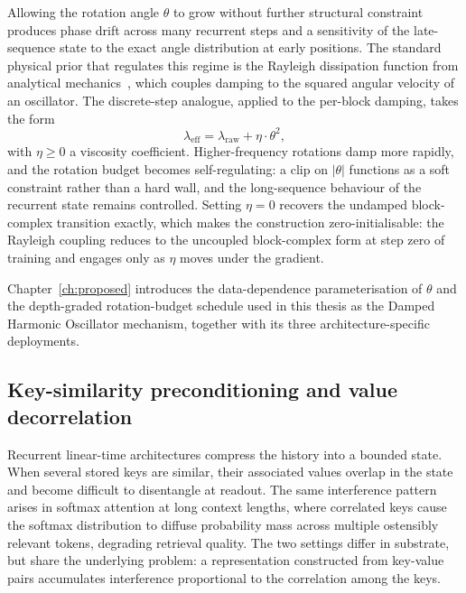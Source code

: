 Allowing the rotation angle $\theta$ to grow without further
structural constraint produces phase drift across many recurrent
steps and a sensitivity of the late-sequence state to the exact angle
distribution at early positions. The standard physical prior that
regulates this regime is the Rayleigh dissipation function from
analytical mechanics~\cite[Sections 1.5 and 2.5]{goldstein2002classical},
which couples damping to the squared angular velocity of an
oscillator. The discrete-step analogue, applied to the per-block
damping, takes the form
\begin{equation}\label{eq:rayleigh}
\lambda_{\mathrm{eff}} = \lambda_{\mathrm{raw}} + \eta \cdot \theta^{2},
\end{equation}
with $\eta \ge 0$ a viscosity coefficient. Higher-frequency rotations
damp more rapidly, and the rotation budget becomes self-regulating: a
clip on $|\theta|$ functions as a soft constraint rather than a hard
wall, and the long-sequence behaviour of the recurrent state remains
controlled. Setting $\eta = 0$ recovers the undamped block-complex
transition exactly, which makes the construction zero-initialisable:
the Rayleigh coupling reduces to the uncoupled block-complex form at
step zero of training and engages only as $\eta$ moves under the
gradient.

Chapter~\ref{ch:proposed} introduces the data-dependence
parameterisation of $\theta$ and the depth-graded rotation-budget
schedule used in this thesis as the Damped Harmonic Oscillator
mechanism, together with its three architecture-specific deployments.

\subsection{Key-similarity preconditioning and value decorrelation}\label{sec:primitives:cvd}

Recurrent linear-time architectures compress the history into a
bounded state. When several stored keys are similar, their associated
values overlap in the state and become difficult to disentangle at
readout. The same interference pattern arises in softmax attention at
long context lengths, where correlated keys cause the softmax
distribution to diffuse probability mass across multiple ostensibly
relevant tokens, degrading retrieval quality. The two settings differ
in substrate, but share the underlying problem: a representation
constructed from key-value pairs accumulates interference proportional
to the correlation among the keys.

